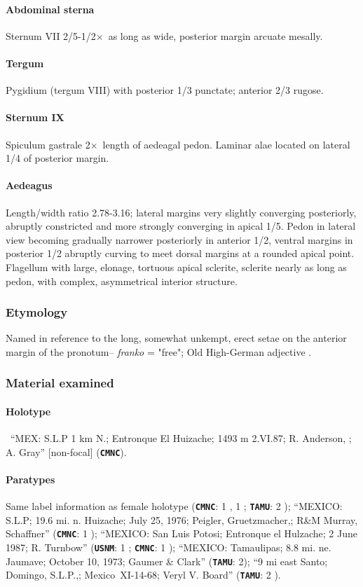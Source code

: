 \documentclass[fleqn,10pt,lineno]{wlpeerj} %
\newcommand{\x}{$\times$~}
\begin{document}
			\paragraph{Abdominal sterna}
				Sternum VII 2/5-1/2\x as long as wide, posterior margin arcuate mesally.
			\paragraph{Tergum}
				Pygidium (tergum VIII) with posterior 1/3 punctate; anterior 2/3 rugose.
			\paragraph{Sternum IX}
				Spiculum gastrale 2\x length of aedeagal pedon. Laminar alae located on lateral 1/4 of posterior margin.
			\paragraph{Aedeagus}
				Length/width ratio 2.78-3.16; lateral margins very slightly converging posteriorly, abruptly constricted and more strongly converging in apical 1/5.
				Pedon in lateral view becoming gradually narrower posteriorly in anterior 1/2, ventral margins in posterior 1/2 abruptly curving to meet dorsal margins at a rounded apical point.
				Flagellum with large, elonage, tortuous apical sclerite, sclerite nearly as long as pedon, with complex, asymmetrical interior structure.
		\subsubsection*{Etymology}
			Named in reference to the long, somewhat unkempt, erect setae on the anterior margin of the pronotum-- \textit{franko} = "free"; Old High-German adjective \citep{brown1956}.
		\subsubsection*{Material examined}
			\paragraph{Holotype}
				\female~``MEX: S.L.P 1 km N.; Entronque El Huizache; 1493 m 2.VI.87; R. Anderson, \underline{}; \underline{} A. Gray'' [non-focal] (\texttt{\textbf{CMNC}}).
			\paragraph{Paratypes}
				Same label information as female holotype (\texttt{\textbf{CMNC}}:  1 \female, 1 \male; \texttt{\textbf{TAMU}}: 2 \male);
				``MEXICO: S.L.P; 19.6 mi. n. Huizache; July 25, 1976; Peigler, Gruetzmacher,; R\&M Murray, Schaffner'' (\texttt{\textbf{CMNC}}: 1 \male);
				``MEXICO: San Luis Potosi; Entronque el Hulzache; 2 June 1987; R. Turnbow'' (\texttt{\textbf{USNM}}: 1 \female; \texttt{\textbf{CMNC}}: 1 \male);
				``MEXICO: Tamaulipas; 8.8 mi. ne. Jaumave; October 10, 1973; Gaumer \& Clark'' (\texttt{\textbf{TAMU}}: 2\female);
				``9 mi east Santo; Domingo, S.L.P.,; Mexico~XI-14-68; Veryl V. Board'' (\texttt{\textbf{TAMU}}: 2 \male).
\end{document}
